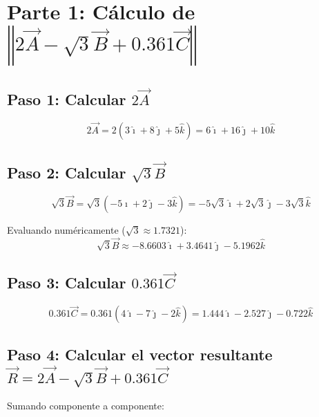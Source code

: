 \documentclass[12pt,letterpaper]{article}
\begin{document}
\section*{Parte 1: C\'alculo de $\left\Vert 2\vec{A}-\sqrt{3}\vec{B}+0.361\vec{C}\right\Vert$}

\subsection*{Paso 1: Calcular $2\vec{A}$}

\begin{equation*}
2\vec{A} = 2(3\hat{\imath}+8\hat{\jmath}+5\hat{k}) = \boxed{6\hat{\imath}+16\hat{\jmath}+10\hat{k}}
\end{equation*}

\subsection*{Paso 2: Calcular $\sqrt{3}\vec{B}$}

\begin{equation*}
\sqrt{3}\vec{B} = \sqrt{3}(-5\hat{\imath}+2\hat{\jmath}-3\hat{k}) = -5\sqrt{3}\hat{\imath}+2\sqrt{3}\hat{\jmath}-3\sqrt{3}\hat{k}
\end{equation*}

Evaluando num\'ericamente ($\sqrt{3} \approx 1.7321$):
\begin{equation*}
\sqrt{3}\vec{B} \approx \boxed{-8.6603\hat{\imath}+3.4641\hat{\jmath}-5.1962\hat{k}}
\end{equation*}

\subsection*{Paso 3: Calcular $0.361\vec{C}$}

\begin{equation*}
0.361\vec{C} = 0.361(4\hat{\imath}-7\hat{\jmath}-2\hat{k}) = \boxed{1.444\hat{\imath}-2.527\hat{\jmath}-0.722\hat{k}}
\end{equation*}

\subsection*{Paso 4: Calcular el vector resultante $\vec{R} = 2\vec{A}-\sqrt{3}\vec{B}+0.361\vec{C}$}

Sumando componente a componente:
\end{document}
